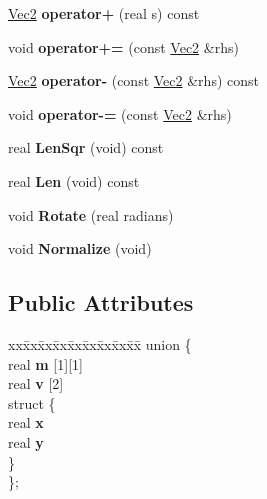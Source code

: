 \begin{DoxyCompactItemize}
\mbox{\hyperlink{struct_vec2}{Vec2}} {\bfseries operator+} (real s) const
\item 
\mbox{\label{struct_vec2_a58f7a9fd50f38f089528cb12af4dd13f}} 
void {\bfseries operator+=} (const \mbox{\hyperlink{struct_vec2}{Vec2}} \&rhs)
\item 
\mbox{\label{struct_vec2_a6c757ff81021ae3ffabf06a6afcdb6bd}} 
\mbox{\hyperlink{struct_vec2}{Vec2}} {\bfseries operator-\/} (const \mbox{\hyperlink{struct_vec2}{Vec2}} \&rhs) const
\item 
\mbox{\label{struct_vec2_afb078fac709c7bd64b6c92567a310563}} 
void {\bfseries operator-\/=} (const \mbox{\hyperlink{struct_vec2}{Vec2}} \&rhs)
\item 
\mbox{\label{struct_vec2_adb82107cd6ae9725ca606ad64ff1ce36}} 
real {\bfseries Len\+Sqr} (void) const
\item 
\mbox{\label{struct_vec2_ab268b54ca012575edd021412bfdbaf91}} 
real {\bfseries Len} (void) const
\item 
\mbox{\label{struct_vec2_a36c8e58b7451526e4280deef8caf904e}} 
void {\bfseries Rotate} (real radians)
\item 
\mbox{\label{struct_vec2_ab37a161e393133ba7083d3f9386c0173}} 
void {\bfseries Normalize} (void)
\end{DoxyCompactItemize}
\subsection*{Public Attributes}
\begin{DoxyCompactItemize}
\item 
\mbox{\label{struct_vec2_a82bb422b66a9d3d85f8e85c5ad4cc477}} 
\begin{tabbing}
xx\=xx\=xx\=xx\=xx\=xx\=xx\=xx\=xx\=\kill
union \{\\
\>real {\bfseries m} \mbox{[}1\mbox{]}\mbox{[}1\mbox{]}\\
\>real {\bfseries v} \mbox{[}2\mbox{]}\\
\mbox{\label{union_vec2_1_1_0D0_a457fc8733fab6c5d599114de82663036}} 
\>struct \{\\
\>\>real {\bfseries x}\\
\>\>real {\bfseries y}\\
\>\} \\
\}; \\

\end{tabbing}\end{DoxyCompactItemize}



